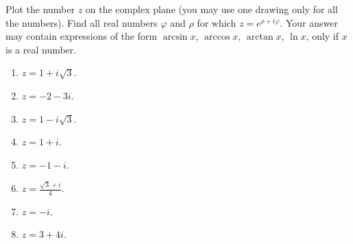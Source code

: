 
Plot the number $z$ on the complex plane (you may use one drawing only for all the numbers). Find all real numbers $\varphi$ and $\rho$ for which $z=e^{\rho+i\varphi}$. Your answer may contain expressions of the form $\arcsin x$, $\arccos x$, $\arctan x$, $\ln x$, only if $x$ is a real number.
\begin{multicols}{2}
\begin{enumerate}[ref={\fcProblemRef}]
\item \label{prob1plussqrt3} $z=1+i\sqrt{3}$.

\item \label{prob2plus3i} $z=-2-3i$.

\item $z=1-i\sqrt{3}$.

\item $z=1+i$.

\item $z=-1-i$.

\item $z=\frac{\sqrt{3}+i}{4}$.

\item $z=-i$.

\item $z=3+4i$.

\end{enumerate}
\end{multicols}